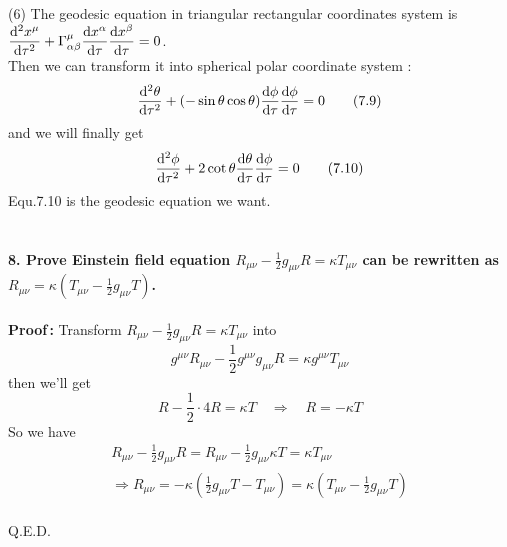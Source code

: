 \documentclass[12pt]{article}
\begin{document}
(6) The geodesic equation in triangular rectangular coordinates system is $\displaystyle \frac{\mathop{}\!\mathrm{d}^{2}x^{\mu}}{\mathop{}\!\mathrm{d}\tau^{2}}+\Gamma^{\mu}_{\alpha\beta}\frac{\mathop{}\!\mathrm{d} x^{\alpha}}{\mathop{}\!\mathrm{d}\tau}\frac{\mathop{}\!\mathrm{d} x^{\beta}}{\mathop{}\!\mathrm{d}\tau}=0$.\\
Then we can transform it into spherical polar coordinate system :
\begin{equation}
\displaystyle 
\frac{\mathop{}\!\mathrm{d}^{2}\theta}{\mathop{}\!\mathrm{d}\tau^{2}}+(-\sin\theta\cos\theta)\frac{\mathop{}\!\mathrm{d}\phi}{\mathop{}\!\mathrm{d}\tau}\frac{\mathop{}\!\mathrm{d}\phi}{\mathop{}\!\mathrm{d}\tau}=0
	\tag{7.9}
\end{equation}
and we will finally get
\begin{equation}
\displaystyle 
\frac{\mathop{}\!\mathrm{d}^{2}\phi}{\mathop{}\!\mathrm{d}\tau^{2}}+2\cot\theta\frac{\mathop{}\!\mathrm{d}\theta}{\mathop{}\!\mathrm{d}\tau}\frac{\mathop{}\!\mathrm{d}\phi}{\mathop{}\!\mathrm{d}\tau}=0
	\tag{7.10}
\end{equation}
Equ.7.10 is the geodesic equation we want.
~\\
~\\
~\\
\textbf{8. Prove Einstein field equation $\displaystyle R_{\mu\nu}-\frac{1}{2}g_{\mu\nu}R=\kappa T_{\mu\nu}$ can be rewritten as $\displaystyle R_{\mu\nu}=\kappa(T_{\mu\nu}-\frac{1}{2}g_{\mu\nu}T)$.} \\		
~\\
\textbf{Proof\,:} Transform $\displaystyle R_{\mu\nu}-\frac{1}{2}g_{\mu\nu}R=\kappa T_{\mu\nu}$ into 
\begin{equation}
\displaystyle
g^{\mu\nu}R_{\mu\nu}-\frac{1}{2}g^{\mu\nu}g_{\mu\nu}R=\kappa g^{\mu\nu}T_{\mu\nu}
	\tag{8.1}
\end{equation}
then we'll get
\begin{equation}
\displaystyle
R-\frac{1}{2} \cdot 4R=\kappa T \quad \Rightarrow  \quad R=-\kappa T	%
	\tag{8.2}
\end{equation}
So we have
\begin{equation}
\begin{aligned}
\displaystyle
R_{\mu\nu}-\frac{1}{2}g_{\mu\nu}R=R_{\mu\nu}-\frac{1}{2}g_{\mu\nu}\kappa T=\kappa T_{\mu\nu}\\
\Rightarrow R_{\mu\nu}=-\kappa(\frac{1}{2}g_{\mu\nu}T-T_{\mu\nu})=\kappa(T_{\mu\nu}-\frac{1}{2}g_{\mu\nu}T)
\end{aligned}
	\tag{8.3}
\end{equation}
~\\
Q.E.D.
~\\
~\\
~\\
\end{document}
